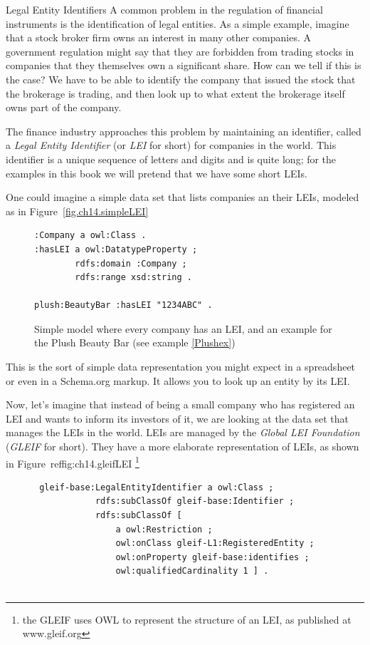 \begin{challenge}{Legal Entity Identifiers}
A common problem in the regulation of financial instruments is the identification of legal entities.  As a simple example, 
imagine that a stock broker firm owns an interest in many other companies.  A government regulation might say that they are 
forbidden from trading 
stocks in companies that they themselves own a significant share.  How can we tell if this is the case?  We have to be able to 
identify the company that issued the stock that the brokerage is trading, and then look up to what extent the brokerage itself
owns part of the company. 

\solution

The finance industry approaches this problem by maintaining an identifier, called a \emph{Legal Entity Identifier} (or \emph{LEI} for short)
for companies in the world.  This identifier is a unique sequence of 
letters and digits and is quite long; for the examples in this book we will pretend that we have some short LEIs. 

One could imagine a simple data set that lists companies an their LEIs, modeled as in Figure~\ref{fig.ch14.simpleLEI}

\begin{figure}
\begin{lstlisting}
:Company a owl:Class .
:hasLEI a owl:DatatypeProperty ;
        rdfs:domain :Company ;
        rdfs:range xsd:string .

plush:BeautyBar :hasLEI "1234ABC" .        
\end{lstlisting}
    \caption{Simple model where every company has an LEI, and an example for the Plush Beauty Bar (see example \ref{Plushex})}
    \label{fig:ch14.simpleLEI}
\end{figure}


This is the sort of simple data representation you might expect in a spreadsheet or even in a Schema.org markup.  It allows you 
to look up an entity by its LEI. 

Now, let's imagine that instead of being a small company who has registered an LEI and wants to inform its investors 
of it, we are looking at the data set that manages the LEIs in the world.  LEIs are managed by the 
\emph{Global LEI Foundation} (\emph{GLEIF} for short).  They have a more elaborate representation of LEIs, as shown in 
Figure~ref{fig:ch14.gleifLEI} \footnote{the GLEIF uses OWL to represent the structure of an LEI, as published at www.gleif.org}

\begin{figure}
 \begin{lstlisting}
 gleif-base:LegalEntityIdentifier a owl:Class ;
            rdfs:subClassOf gleif-base:Identifier ;
            rdfs:subClassOf [
                a owl:Restriction ;
                owl:onClass gleif-L1:RegisteredEntity ;
                owl:onProperty gleif-base:identifies ;
                owl:qualifiedCardinality 1 ] .
                

\end{lstlisting}
\end{figure}
\end{challenge}
